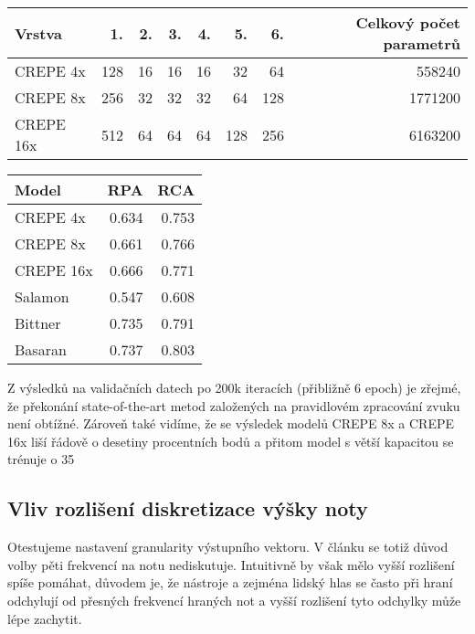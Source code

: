     \begin{tabular}{lrrrrrrr}
    \toprule
    Vrstva     &  1.   &  2.  &  3.  &  4.  &  5.   &  6.  &  Celkový počet parametrů \\
    \midrule
    CREPE 4x   &  128  &  16  &  16  &  16  &  32   &  64  &  558240 \\
    CREPE 8x   &  256  &  32  &  32  &  32  &  64   &  128 &  1771200 \\
    CREPE 16x  &  512  &  64  &  64  &  64  &  128  &  256 &  6163200 \\
    \bottomrule
    \end{tabular}


    \begin{tabular}{lrr}
    \toprule
    Model      &  RPA    &  RCA \\
    \midrule
    CREPE 4x   &  0.634  &  0.753 \\
    CREPE 8x   &  0.661  &  0.766 \\
    CREPE 16x  &  0.666  &  0.771 \\
    Salamon    &  0.547  &  0.608 \\
    Bittner    &  0.735  &  0.791 \\
    Basaran    &  0.737  &  0.803 \\
    \bottomrule
    \end{tabular}

Z výsledků na validačních datech po 200k iteracích (přibližně 6 epoch) je zřejmé, že překonání state-of-the-art metod založených na pravidlovém zpracování zvuku \citep{salamon2012musical} není obtížné. Zároveň také vidíme, že se výsledek modelů CREPE 8x a CREPE 16x liší řádově o desetiny procentních bodů a přitom model s větší kapacitou se trénuje o 35%


\subsection{Vliv rozlišení diskretizace výšky noty}

Otestujeme nastavení granularity výstupního vektoru. V článku \cite{Kim2018} se totiž důvod volby pěti frekvencí na notu nediskutuje. Intuitivně by však mělo vyšší rozlišení spíše pomáhat, důvodem je, že nástroje a zejména lidský hlas se často při hraní odchylují od přesných frekvencí hraných not a vyšší rozlišení tyto odchylky může lépe zachytit.


